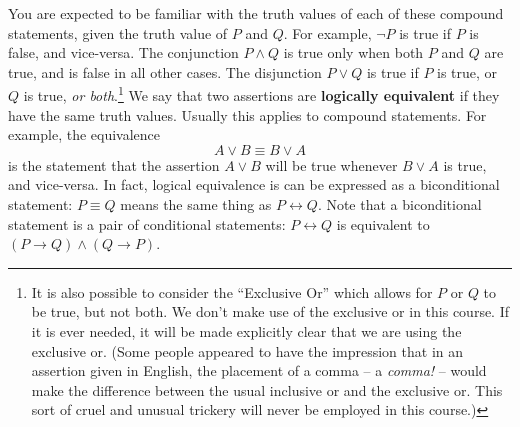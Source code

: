 \documentclass[letterpaper,12pt]{article}
\begin{document}
You are expected to be familiar with the truth values of each of these compound statements, given the truth value of $P$ and $Q$. For example, $\neg P$ is true if $P$ is false, and vice-versa. The conjunction $P\wedge Q$ is true only when both $P$ and $Q$ are true, and is false in all other cases. The disjunction $P\vee Q$ is true if $P$ is true, or $Q$ is true, {\em or both}.\footnote{It is also possible to consider the ``Exclusive Or'' which allows for $P$ or $Q$ to be true, but not both. We don't make use of the exclusive or in this course. If it is ever needed, it will be made explicitly clear that we are using the exclusive or. (Some people appeared to have the impression that in an assertion given in English, the placement of a comma -- a {\em comma!} -- would make the difference between the usual inclusive or and the exclusive or. This sort of cruel and unusual trickery will never be employed in this course.)} We say that two assertions are {\bf logically equivalent} if they have the same truth values. Usually this applies to compound statements. For example, the equivalence
\[
 A\vee B \equiv B\vee A
\]
is the statement that the assertion $A\vee B$ will be true whenever $B\vee A$ is true, and vice-versa. In fact, logical equivalence is can be expressed as a biconditional statement: $P\equiv Q$ means the same thing as $P\leftrightarrow Q$. 
Note that a biconditional statement is a pair of conditional statements: $P\leftrightarrow Q$ is equivalent to $(P\to Q)\wedge (Q\to P)$.
\end{document}
